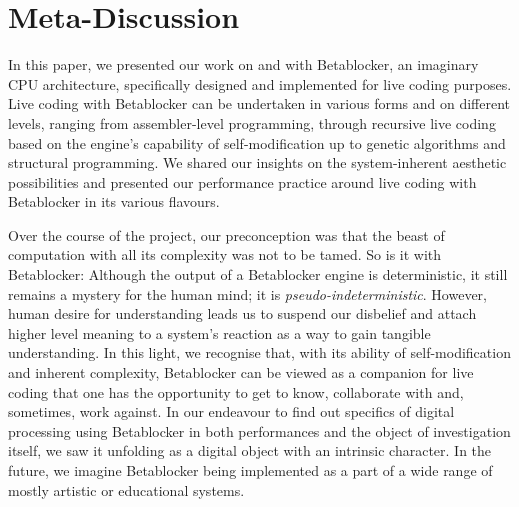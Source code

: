 \documentclass[letterpaper, 12pt]{article}
\begin{document}
\section{Meta-Discussion}
\label{sec:meta}


In this paper, we presented our work on and with Betablocker, an imaginary CPU architecture, specifically designed and implemented for live coding purposes.
Live coding with Betablocker can be undertaken in various forms and on different levels, ranging from assembler-level programming, through recursive live coding based on the engine's capability of self-modification up to genetic algorithms and structural programming.
We shared our insights on the system-inherent aesthetic possibilities and presented our performance practice around live coding with Betablocker in its various flavours.

Over the course of the project, our preconception was that the beast of computation with all its complexity was not to be tamed.
So is it with Betablocker: Although the output of a Betablocker engine is deterministic, it still remains a mystery for the human mind; it is \emph{pseudo-indeterministic}.
However, human desire for understanding leads us to suspend our disbelief and attach higher level meaning to a system's reaction as a way to gain tangible understanding.
In this light, we recognise that, with its ability of self-modification and inherent complexity, Betablocker can be viewed as a companion for live coding that one has the opportunity to get to know, collaborate with and, sometimes, work against.
In our endeavour to find out specifics of digital processing using Betablocker in both performances and the object of investigation itself, we saw it unfolding as a digital object with an intrinsic character.
In the future, we imagine Betablocker being implemented as a part of a wide range of mostly artistic or educational systems.
\parskip 18pt




% 

\end{document}

